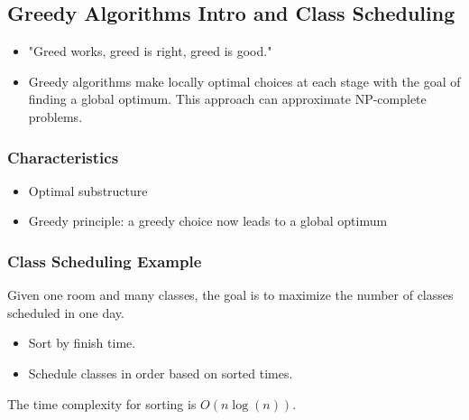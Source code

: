 \subsection{Greedy Algorithms Intro and Class Scheduling}

\begin{intuition}
    \begin{itemize}
        \item "Greed works, greed is right, greed is good." 
        \item Greedy algorithms make locally optimal choices at each stage with the goal of finding a global optimum. This approach can approximate NP-complete problems.
    \end{itemize}
\end{intuition}

\subsubsection{Characteristics}
\begin{intuition}
        \begin{itemize}
            \item Optimal substructure
            \item Greedy principle: a greedy choice now leads to a global optimum
        \end{itemize}
\end{intuition}

\subsubsection{Class Scheduling Example}
\begin{example}
    Given one room and many classes, the goal is to maximize the number of classes scheduled in one day. 
    \begin{itemize}
        \item Sort by finish time.
        \item Schedule classes in order based on sorted times.
    \end{itemize}
    The time complexity for sorting is $O(n\log(n))$.
\end{example}

